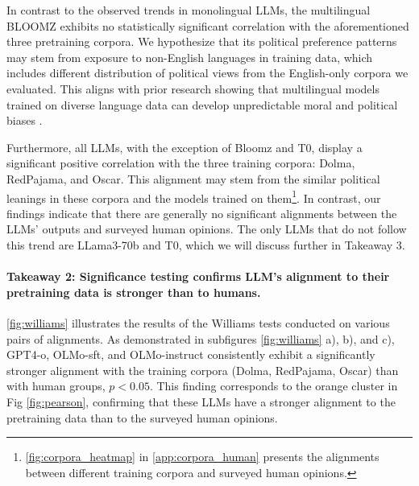 In contrast to the observed trends in monolingual LLMs, the multilingual BLOOMZ exhibits no statistically significant correlation with the aforementioned three pretraining corpora. We hypothesize that its political preference patterns may stem from exposure to non-English languages in training data, which includes different distribution of political views from the English-only corpora we evaluated. This aligns with prior research showing that multilingual models trained on diverse language data can develop unpredictable moral and political biases \cite{haemmerl-etal-2023-speaking}. 

Furthermore, all LLMs, with the exception of Bloomz and T0, display a significant positive correlation with the three training corpora: Dolma, RedPajama, and Oscar. This alignment may stem from the similar political leanings in these corpora and the models trained on them\footnote{\autoref{fig:corpora_heatmap} in \autoref{app:corpora_human} presents the alignments between different training corpora and surveyed human opinions.
}. In contrast, our findings indicate that there are generally no significant alignments between the LLMs' outputs and surveyed human opinions. The only LLMs that do not follow this trend are LLama3-70b and T0, which we will discuss further in Takeaway 3.







\paragraph{Takeaway 2: Significance testing confirms LLM's alignment to their pretraining data is stronger than to humans.}
\autoref{fig:williams} illustrates the results of the Williams tests conducted on various pairs of alignments. As demonstrated in subfigures \autoref{fig:williams} a), b), and c),  GPT4-o, OLMo-sft, and OLMo-instruct consistently exhibit a significantly stronger alignment with the training corpora (Dolma, RedPajama, Oscar) than with human groups, \( p < 0.05 \). This finding corresponds to the orange cluster in Fig \ref{fig:pearson}, confirming that these LLMs have a stronger alignment to the pretraining data than to the surveyed human opinions.

